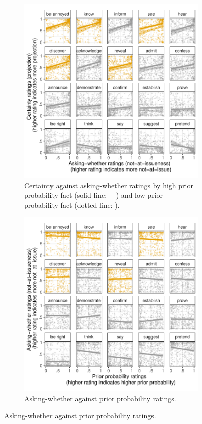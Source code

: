 \documentclass[11pt,fleqn]{article}
\newcommand{\6}{\mbox{$[\hspace*{-.6mm}[$}}
\newcommand{\9}{\mbox{$]\hspace*{-.6mm}]$}}
\begin{document}
\begin{figure}[h!]
\begin{subfigure}[t]{0.49\textwidth}
\centering
\includegraphics[width=\textwidth]{../../results/exp1/graphs/projection-by-ai-and-prior}
\caption{Certainty against asking-whether ratings by high prior probability fact (solid line: ---) and low prior probability fact (dotted line: \raisebox{1mm}{\ldots}).}\label{fig:certainty-by-ai-and-prior}
 \end{subfigure}\hfill 
\begin{subfigure}[t]{0.49\textwidth}
\centering
\includegraphics[width=\textwidth]{../../results/exp1/graphs/ai-by-prior}
\caption{Asking-whether against prior probability ratings.}\label{fig:ai-by-prior}
\end{subfigure} 
  

\end{figure}
\end{document}
